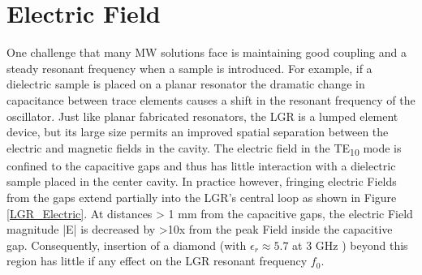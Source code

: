 \section{Electric Field}

One challenge that many MW solutions face is maintaining good coupling and a steady resonant frequency when a sample is introduced. For example, if a dielectric sample is placed on a planar resonator the dramatic change in capacitance between trace elements causes a shift in the resonant frequency \cite{bayat2014efficient, sasaki2016broadband, zhang2016microwave} of the oscillator. Just like planar fabricated resonators, the LGR is a lumped element device, but its large size permits an improved spatial separation between the electric and magnetic fields in the cavity. The electric field in the TE\textsubscript{10} mode is confined to the capacitive gaps and thus has little interaction with a dielectric sample placed in the center cavity. In practice however, fringing electric Fields from the gaps extend partially into the LGR's central loop as shown in Figure \ref{LGR_Electric}. At distances > 1 mm from the capacitive gaps, the electric Field magnitude |E| is decreased by >10x from the peak Field inside the capacitive gap. Consequently, insertion of a diamond (with
$\epsilon_r \approx 5.7$ at 3 GHz \cite{ibarra1997wide}) beyond this region has little if any effect on the LGR resonant frequency $f_0$.


